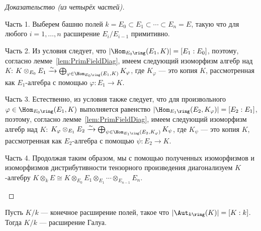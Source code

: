 \documentclass[
	extrafontsizes,
	11pt,
	hyphens,
]{memoir}
\begin{document}
\begin{proof}[Доказательство (из четырёх частей)]
~\begin{proofdescription}

\item[Часть 1.]
Выберем башню полей
\(k = E_0 \subset E_1 \subset \cdots{} \subset E_n = E\),
такую что для любого \(i = 1, \dots{}, n\) расширение \(E_i / E_{i-1}\) примитивно.

\item[Часть 2.]
Из условия следует, что
\(\lvert \Hom_{E_0\ring}(E_1,K) \rvert = [E_1 : E_0]\),
поэтому, согласно лемме~\ref{lem:PrimFieldDiag}, имеем следующий изоморфизм
алгебр над \(K\):
\(K \otimes_{E_0} E_1 \xrightarrow{\sim} \bigoplus_{\varphi \in \Hom_{E_0\ring}(E_1,K)} K_\varphi\),
где \(K_\varphi\) --- это копия \(K\), рассмотренная как \(E_1\)-алгебра с помощью \(\varphi : E_1 \to K\).

\item[Часть 3.]
Естественно, из условия также следует, что для произвольного \(\varphi \in \Hom_{E_0\ring}(E_1,K)\)
выполняется равенство
\(\lvert \Hom_{E_1\ring}(E_2,K_\varphi) \rvert = [E_2 : E_1]\),
поэтому, согласно лемме~\ref{lem:PrimFieldDiag}, имеем следующий изоморфизм
алгебр над \(K\):
\(K_\varphi \otimes_{E_1} E_2 \xrightarrow{\sim} \bigoplus_{\psi \in \Hom_{E_1\ring}(E_2,K_\varphi)} K_\psi\),
где \(K_\psi\) --- это копия \(K\), рассмотренная как \(E_2\)-алгебра с помощью \(\psi : E_2 \to K\).

\item[Часть 4.]
Продолжая таким образом, мы с помощью полученных изоморфизмов и изоморфизмов дистрибутивности тензорного произведения диагонализуем \(K\)-алгебру
\(
K \otimes_k E \cong
K \otimes_{E_0} E_1 \otimes_{E_1} \cdots{} \otimes_{E_{n-1}} E_n
\).
\qedhere
\end{proofdescription}
\end{proof}

\begin{corollary} \label{cor:MaxSymGalExt}
Пусть \(K/k\) --- конечное расширение полей, такое что \(\lvert \Aut_{k\ring}(K) \rvert = [K : k]\).
Тогда \(K/k\) --- расширение Галуа.
\end{corollary}

\end{document}
